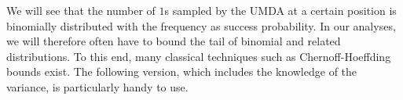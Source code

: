 \documentclass[11pt, a4paper]{article}
\newtheorem{lemma}{Lemma}
\renewcommand*{\Re}{\mathds{R}}
\newcommand*{\E}{\mathrm{E}}
\newcommand*{\smallO}{\mathrm{o}}
\newcommand*{\eulerE}{\mathrm{e}}
\begin{document}
%
%
%
%






We will see that the number of $1$s sampled by the UMDA at a certain 
position is binomially distributed with the frequency as success probability. 
In our analyses,  
we will therefore often have to bound the tail of binomial and related distributions.   
To this end, 
many classical techniques such as Chernoff-Hoeffding bounds exist. The following 
version, which includes the knowledge of the variance, is particularly handy to use.
\end{document}
